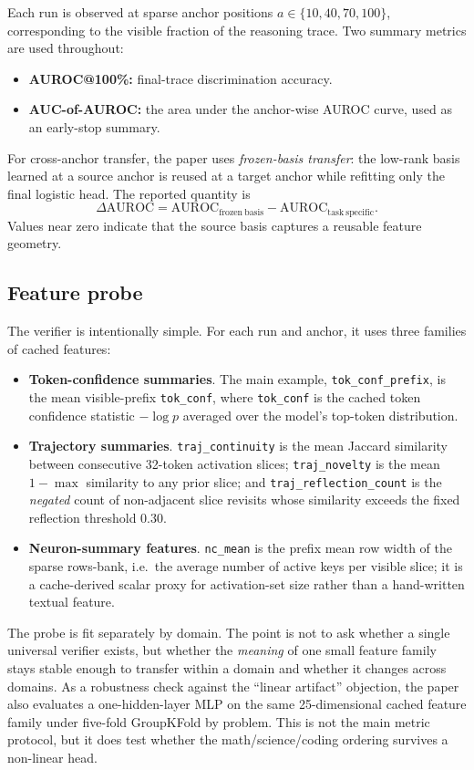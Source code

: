 \documentclass[10pt]{article}
\begin{document}
Each run is observed at sparse anchor positions $a \in \{10,40,70,100\}$, corresponding to the visible fraction of the reasoning trace. Two summary metrics are used throughout:
\begin{itemize}
    \item \textbf{AUROC@100\%:} final-trace discrimination accuracy.
    \item \textbf{AUC-of-AUROC:} the area under the anchor-wise AUROC curve, used as an early-stop summary.
\end{itemize}

For cross-anchor transfer, the paper uses \emph{frozen-basis transfer}: the low-rank basis learned at a source anchor is reused at a target anchor while refitting only the final logistic head. The reported quantity is
\[
\Delta\mathrm{AUROC} = \mathrm{AUROC}_{\mathrm{frozen\ basis}} - \mathrm{AUROC}_{\mathrm{task\ specific}}.
\]
Values near zero indicate that the source basis captures a reusable feature geometry.

\subsection{Feature probe}

The verifier is intentionally simple. For each run and anchor, it uses three families of cached features:
\begin{itemize}
    \item \textbf{Token-confidence summaries}. The main example, \texttt{tok\_conf\_prefix}, is the mean visible-prefix \texttt{tok\_conf}, where \texttt{tok\_conf} is the cached token confidence statistic $-\log p$ averaged over the model's top-token distribution.
    \item \textbf{Trajectory summaries}. \texttt{traj\_continuity} is the mean Jaccard similarity between consecutive 32-token activation slices; \texttt{traj\_novelty} is the mean $1-\max$ similarity to any prior slice; and \texttt{traj\_reflection\_count} is the \emph{negated} count of non-adjacent slice revisits whose similarity exceeds the fixed reflection threshold $0.30$.
    \item \textbf{Neuron-summary features}. \texttt{nc\_mean} is the prefix mean row width of the sparse rows-bank, i.e.\ the average number of active keys per visible slice; it is a cache-derived scalar proxy for activation-set size rather than a hand-written textual feature.
\end{itemize}

The probe is fit separately by domain. The point is not to ask whether a single universal verifier exists, but whether the \emph{meaning} of one small feature family stays stable enough to transfer within a domain and whether it changes across domains. As a robustness check against the ``linear artifact'' objection, the paper also evaluates a one-hidden-layer MLP on the same 25-dimensional cached feature family under five-fold GroupKFold by problem. This is not the main metric protocol, but it does test whether the math/science/coding ordering survives a non-linear head.
\end{document}
